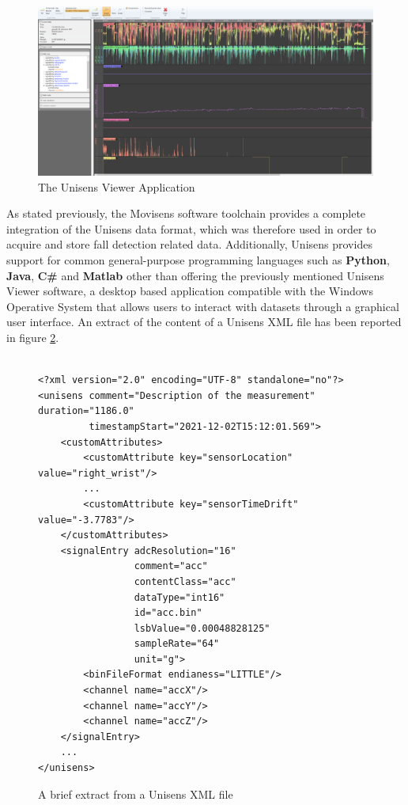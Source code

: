 \vspace{5mm}

\begin{figure}[h!]
    \centering
    \includegraphics[width=15cm]{./images/unisens_viewer.png}
    \caption{The Unisens Viewer Application}
    \label{fig:unisens-viewer-gui}
\end{figure}

As stated previously, the Movisens software toolchain provides a complete integration of the Unisens data format, which was therefore used in order to acquire and store fall detection related data. Additionally, Unisens provides support for common general-purpose programming languages such as \textbf{Python}, \textbf{Java}, \textbf{C\#} and \textbf{Matlab} other than offering the previously mentioned Unisens Viewer software, a desktop based application compatible with the Windows Operative System that allows users to interact with datasets through a graphical user interface. An extract of the content of a Unisens XML file has been reported in figure \ref{fig:unisens-xml}.

\vspace{20mm}

\begin{figure}[H]
\begin{verbatim}

<?xml version="2.0" encoding="UTF-8" standalone="no"?>
<unisens comment="Description of the measurement" duration="1186.0"
         timestampStart="2021-12-02T15:12:01.569">
    <customAttributes>
        <customAttribute key="sensorLocation" value="right_wrist"/>
        ...
        <customAttribute key="sensorTimeDrift" value="-3.7783"/>
    </customAttributes>
    <signalEntry adcResolution="16"
                 comment="acc"
                 contentClass="acc"
                 dataType="int16"
                 id="acc.bin"
                 lsbValue="0.00048828125"
                 sampleRate="64"
                 unit="g">
        <binFileFormat endianess="LITTLE"/>
        <channel name="accX"/>
        <channel name="accY"/>
        <channel name="accZ"/>
    </signalEntry>
    ...
</unisens>
\end{verbatim}
\caption{A brief extract from a Unisens XML file}
\label{fig:unisens-xml}
\end{figure}

